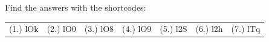   \label{m38727**end}
  \label{337cc49099d6e82169c54b5d0fc3878f**end}
\par {} Find the answers with the shortcodes:
 \par \begin{tabular}[h]{cccccc}
 (1.) lOk  &  (2.) lO0  &  (3.) lO8  &  (4.) lO9  &  (5.) l2S  &  (6.) l2h  &  (7.) lTq  & \end{tabular}
